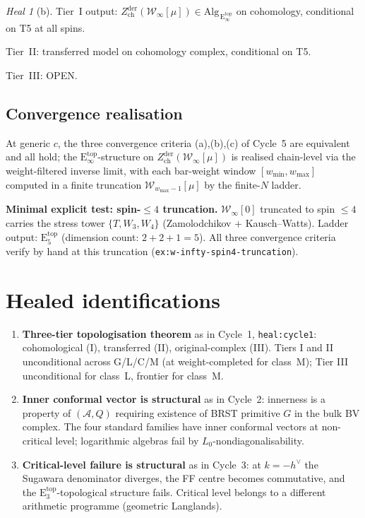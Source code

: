 \documentclass{article}
\theoremstyle{definition}
\theoremstyle{remark}
\newtheorem{heal}[theorem]{Heal}
\newcommand{\Zder}{Z^{\mathrm{der}}_{\mathrm{ch}}}
\newcommand{\Etop}[1]{\mathrm{E}_{#1}^{\mathrm{top}}}
\newcommand{\cW}{\mathcal{W}}
\newcommand{\cA}{\mathcal{A}}
\begin{document}
\begin{heal}[b]
Tier~I output: $\Zder(\cW_\infty[\mu]) \in
\mathrm{Alg}_{\,\Etop{\infty}}$ on cohomology, conditional
on T5 at all spins.

Tier~II: transferred model on cohomology complex,
conditional on T5.

Tier~III: OPEN.

\subsection{Convergence realisation}
At generic $c$, the three convergence criteria (a),(b),(c)
of Cycle~5 are equivalent and all hold; the
$\Etop{\infty}$-structure on
$\Zder(\cW_\infty[\mu])$ is realised chain-level via the
weight-filtered inverse limit, with each bar-weight window
$[w_{\min}, w_{\max}]$ computed in a finite truncation
$\cW_{w_{\max}-1}[\mu]$ by the finite-$N$ ladder.

\textbf{Minimal explicit test: spin-$\le 4$ truncation.}
$\cW_\infty[0]$ truncated to spin $\le 4$ carries the
stress tower $\{T, W_3, W_4\}$ (Zamolodchikov +
Kausch--Watts). Ladder output: $\Etop{5}$ (dimension
count: $2 + 2 + 1 = 5$). All three convergence criteria
verify by hand at this truncation
(\texttt{ex:w-infty-spin4-truncation}).

\section{Healed identifications}
\label{sec:opus-healed}

\begin{enumerate}
\item \textbf{Three-tier topologisation theorem} as in
Cycle~1, \texttt{heal:cycle1}: cohomological (I), transferred
(II), original-complex (III). Tiers I and II unconditional
across G/L/C/M (at weight-completed for class~M); Tier III
unconditional for class~L, frontier for class~M.

\item \textbf{Inner conformal vector is structural} as in
Cycle~2: innerness is a property of $(\cA, Q)$ requiring
existence of BRST primitive $G$ in the bulk BV complex. The
four standard families have inner conformal vectors at
non-critical level; logarithmic algebras fail by
$L_0$-nondiagonalisability.

\item \textbf{Critical-level failure is structural} as in
Cycle~3: at $k = -h^\vee$ the Sugawara denominator diverges,
the FF centre becomes commutative, and the
$\Etop{3}$-topological structure fails. Critical level
belongs to a different arithmetic programme (geometric
Langlands).


\end{enumerate}
\end{heal}
\end{document}
